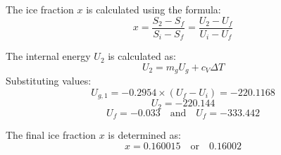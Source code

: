 The ice fraction \( x \) is calculated using the formula:  
\[
x = \frac{S_2 - S_f}{S_i - S_f} = \frac{U_2 - U_f}{U_i - U_f}
\]  

The internal energy \( U_2 \) is calculated as:  
\[
U_2 = m_g U_g + c_V \Delta T
\]  
Substituting values:  
\[
U_{g,1} = -0.2954 \times (U_f - U_i) = -220.1168
\]  
\[
U_2 = -220.144
\]  
\[
U_f = -0.033 \quad \text{and} \quad U_f = -333.442
\]  

The final ice fraction \( x \) is determined as:  
\[
x = 0.160015 \quad \text{or} \quad 0.16002
\]